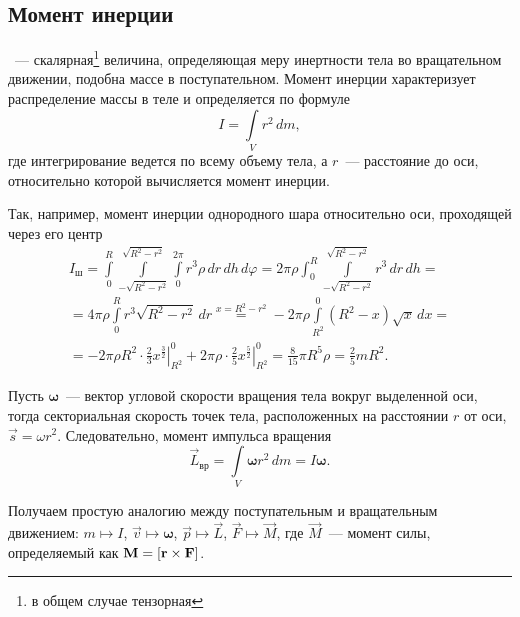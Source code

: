 \subsection{Момент инерции}
\label{sec:inertia-moment}

~--- скалярная\footnote{в общем случае тензорная} величина, определяющая меру инертности тела во вращательном движении, подобна массе в поступательном. Момент инерции характеризует распределение массы в теле и определяется по формуле
\begin{equation}
    I = \int\limits_{V} r^2 \,d m,
\end{equation}
где интегрирование ведется по всему объему тела, а $r$~--- расстояние до оси, относительно которой вычисляется момент инерции.

Так, например, момент инерции однородного шара относительно оси, проходящей через его центр
\begin{multline*}
    I_\text{ш} = \int\limits_0^R \int\limits_{-\sqrt{R^2 - r^2}}^{\sqrt{R^2 - r^2}} \int\limits_0^{2\pi} r^3 \rho \,dr \,dh \,d\varphi 
    = 2\pi \rho \int_0^R \int\limits_{-\sqrt{R^2 - r^2}}^{\sqrt{R^2 - r^2}} r^3 \,dr \,dh = \\
    = 4\pi \rho \int\limits_0^R r^3 \sqrt{R^2 - r^2} \,dr
    \overset{x = R^2 - r^2}{=} -2\pi \rho \int\limits_{R^2}^0 (R^2 - x) \sqrt{x} \, dx = \\
    = - 2\pi \rho R^2 \cdot \left. \frac{2}{3}  x^\frac{3}{2} \right|_{R^2}^0 + 2\pi \rho \cdot \left. \frac{2}{5} x^\frac{5}{2} \right|_{R^2}^0
    = \frac{8}{15} \pi R^5 \rho = \frac{2}{5} m R^2.
\end{multline*}

Пусть $\boldsymbol{\omega}$~--- вектор угловой скорости вращения тела вокруг выделенной оси, тогда секториальная скорость точек тела, расположенных на расстоянии $r$ от оси, $\vec{s} = \omega r^2$. Следовательно, момент импульса вращения 
\begin{equation*}
    \vec{L}_\text{вр} = \int\limits_{V} \boldsymbol{\omega} r^2 \,d m = I\boldsymbol{\omega}.
\end{equation*}

Получаем простую аналогию между поступательным и вращательным движением:
$m \longmapsto I$, $\vec v \longmapsto \boldsymbol\omega$, $\vec{p} \longmapsto \vec{L}$, $\vec F \longmapsto \vec M$, где $\vec{M}$~--- момент силы, определяемый как $\mathbf{M} = \left[\mathbf{r} \times \mathbf{F}\right]$.
